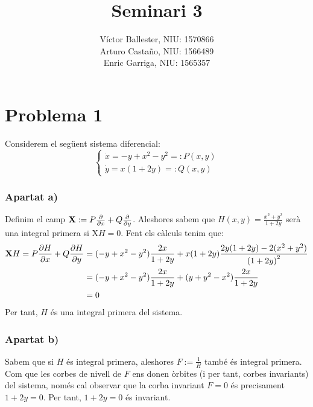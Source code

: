 \documentclass[10pt,a4paper]{article}
\title{\bfseries\Large Seminari 3}
\author{Víctor Ballester, NIU: 1570866\\ Arturo Castaño, NIU: 1566489\\ Enric Garriga, NIU: 1565357}
\date{\parbox{\linewidth}{\centering
  Equacions diferencials II\endgraf
  Grau en Matemàtiques\endgraf
  Universitat Autònoma de Barcelona\endgraf
  Maig de 2022}}
\newcommand{\vf}[1]{\boldsymbol{\mathrm{#1}}} %
\begin{document}
\maketitle
\section*{Problema 1}
Considerem el següent sistema diferencial:
\begin{equation}\label{sist2}
  \begin{cases}
    \dot{x}=-y+x^2-y^2=:P(x,y) \\
    \dot{y}=x(1+2y)=:Q(x,y)
  \end{cases}
\end{equation}
\subsubsection*{Apartat a)}
Definim el camp $\vf{X}:=P\pdv{}{x}+Q\pdv{}{y}$. Aleshores sabem que $H(x,y)=\frac{x^2+y^2}{1+2y}$ serà una integral primera si $\vf{X}H=0$. Fent els càlculs tenim que:
\begin{align*}
  \vf{X}H=P\pdv{H}{x}+Q\pdv{H}{y} & =(-y+x^2-y^2)\frac{2x}{1+2y}+x(1+2y)\frac{2y(1+2y)-2(x^2+y^2)}{{(1+2y)}^2} \\
                                  & =(-y+x^2-y^2)\frac{2x}{1+2y}+(y+y^2-x^2)\frac{2x}{1+2y}                    \\
                                  & =0
\end{align*}
Per tant, $H$ és una integral primera del sistema.
\subsubsection*{Apartat b)}
Sabem que si $H$ és integral primera, aleshores $F:=\frac{1}{H}$ també és integral primera. Com que les corbes de nivell de $F$ ens donen òrbites (i per tant, corbes invariants) del sistema, només cal observar que la corba invariant $F=0$ és precisament $1+2y=0$. Per tant, $1+2y=0$ és invariant.
\end{document}
